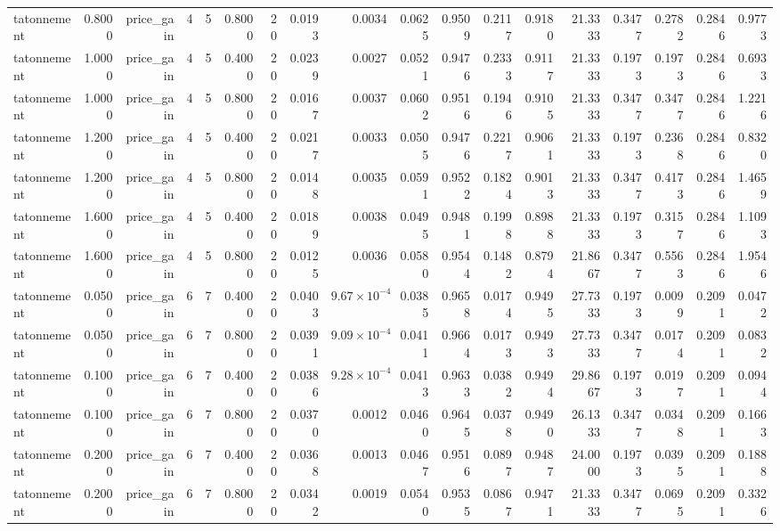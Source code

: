 \begin{table}[htbp]
\begin{tabular}{lrrrrrrrrrrrrrrrrr}
tatonnement & 0.8000 & price\_gain & 4 & 5 & 0.8000 & 20 & 0.0193 & 0.0034 & 0.0625 & 0.9509 & 0.2117 & 0.9180 & 21.3333 & 0.3477 & 0.2782 & 0.2846 & 0.9773 \\
tatonnement & 1.0000 & price\_gain & 4 & 5 & 0.4000 & 20 & 0.0239 & 0.0027 & 0.0521 & 0.9476 & 0.2333 & 0.9117 & 21.3333 & 0.1973 & 0.1973 & 0.2846 & 0.6933 \\
tatonnement & 1.0000 & price\_gain & 4 & 5 & 0.8000 & 20 & 0.0167 & 0.0037 & 0.0602 & 0.9516 & 0.1946 & 0.9105 & 21.3333 & 0.3477 & 0.3477 & 0.2846 & 1.2216 \\
tatonnement & 1.2000 & price\_gain & 4 & 5 & 0.4000 & 20 & 0.0217 & 0.0033 & 0.0505 & 0.9476 & 0.2217 & 0.9061 & 21.3333 & 0.1973 & 0.2368 & 0.2846 & 0.8320 \\
tatonnement & 1.2000 & price\_gain & 4 & 5 & 0.8000 & 20 & 0.0148 & 0.0035 & 0.0591 & 0.9522 & 0.1824 & 0.9013 & 21.3333 & 0.3477 & 0.4173 & 0.2846 & 1.4659 \\
tatonnement & 1.6000 & price\_gain & 4 & 5 & 0.4000 & 20 & 0.0189 & 0.0038 & 0.0495 & 0.9481 & 0.1998 & 0.8988 & 21.3333 & 0.1973 & 0.3157 & 0.2846 & 1.1093 \\
tatonnement & 1.6000 & price\_gain & 4 & 5 & 0.8000 & 20 & 0.0125 & 0.0036 & 0.0580 & 0.9544 & 0.1482 & 0.8794 & 21.8667 & 0.3477 & 0.5563 & 0.2846 & 1.9546 \\
tatonnement & 0.0500 & price\_gain & 6 & 7 & 0.4000 & 20 & 0.0403 & $9.67\times10^{-4}$ & 0.0385 & 0.9658 & 0.0174 & 0.9495 & 27.7333 & 0.1973 & 0.0099 & 0.2091 & 0.0472 \\
tatonnement & 0.0500 & price\_gain & 6 & 7 & 0.8000 & 20 & 0.0391 & $9.09\times10^{-4}$ & 0.0411 & 0.9664 & 0.0173 & 0.9493 & 27.7333 & 0.3477 & 0.0174 & 0.2091 & 0.0832 \\
tatonnement & 0.1000 & price\_gain & 6 & 7 & 0.4000 & 20 & 0.0386 & $9.28\times10^{-4}$ & 0.0413 & 0.9633 & 0.0382 & 0.9494 & 29.8667 & 0.1973 & 0.0197 & 0.2091 & 0.0944 \\
tatonnement & 0.1000 & price\_gain & 6 & 7 & 0.8000 & 20 & 0.0370 & 0.0012 & 0.0460 & 0.9645 & 0.0378 & 0.9490 & 26.1333 & 0.3477 & 0.0348 & 0.2091 & 0.1663 \\
tatonnement & 0.2000 & price\_gain & 6 & 7 & 0.4000 & 20 & 0.0368 & 0.0013 & 0.0467 & 0.9516 & 0.0897 & 0.9487 & 24.0000 & 0.1973 & 0.0395 & 0.2091 & 0.1888 \\
tatonnement & 0.2000 & price\_gain & 6 & 7 & 0.8000 & 20 & 0.0342 & 0.0019 & 0.0540 & 0.9535 & 0.0867 & 0.9471 & 21.3333 & 0.3477 & 0.0695 & 0.2091 & 0.3326 \\

\end{tabular}
\end{table}
